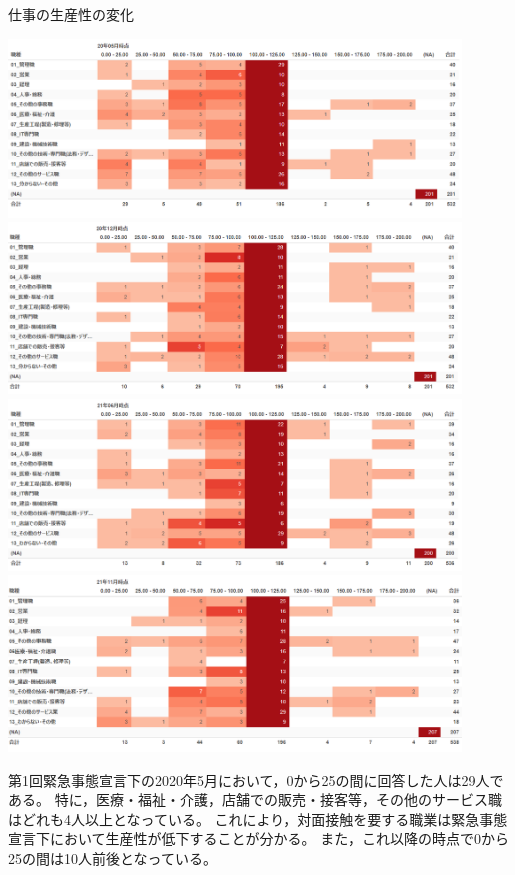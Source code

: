 \documentclass[paper={210mm,297mm},fontsize=15Q,line_length=35zw,number_of_lines=31,head_space=30mm,gutter=40mm,baselineskip=2.0zw,headfoot_verticalposition=1.5zw]{jlreq}
\begin{document}
\begin{table}[H]
  \centering
  \caption{仕事の生産性の変化}
  \includegraphics[width=120mm]{../Figure/c05s03_table_生産性_20-05.png}
  \includegraphics[width=120mm]{../Figure/c05s03_table_生産性_20-12.png}
  \includegraphics[width=120mm]{../Figure/c05s03_table_生産性_21-06.png}
  \includegraphics[width=120mm]{../Figure/c05s03_table_生産性_21-11.png}
  \label{生産性の変化}
\end{table}

第1回緊急事態宣言下の2020年5月において，0から25の間に回答した人は29人である。
特に，医療・福祉・介護，店舗での販売・接客等，その他のサービス職はどれも4人以上となっている。
これにより，対面接触を要する職業は緊急事態宣言下において生産性が低下することが分かる。
また，これ以降の時点で0から25の間は10人前後となっている。
\end{document}
